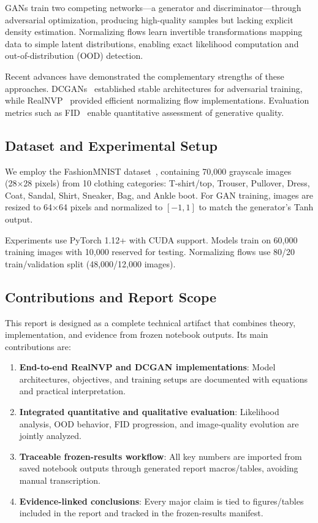 \documentclass[conference,12pt]{IEEEtran}
\begin{document}
GANs train two competing networks---a generator and discriminator---through adversarial optimization, producing high-quality samples but lacking explicit density estimation. Normalizing flows learn invertible transformations mapping data to simple latent distributions, enabling exact likelihood computation and out-of-distribution (OOD) detection.

Recent advances have demonstrated the complementary strengths of these approaches. DCGANs~\cite{radford2016unsupervised} established stable architectures for adversarial training, while RealNVP~\cite{dinh2017density} provided efficient normalizing flow implementations. Evaluation metrics such as FID~\cite{heusel2017gans} enable quantitative assessment of generative quality.

\subsection{Dataset and Experimental Setup}

We employ the FashionMNIST dataset~\cite{xiao2017fashion}, containing 70,000 grayscale images (28×28 pixels) from 10 clothing categories: T-shirt/top, Trouser, Pullover, Dress, Coat, Sandal, Shirt, Sneaker, Bag, and Ankle boot. For GAN training, images are resized to 64×64 pixels and normalized to $[-1,1]$ to match the generator's Tanh output.

Experiments use PyTorch 1.12+ with CUDA support. Models train on 60,000 training images with 10,000 reserved for testing. Normalizing flows use 80/20 train/validation split (48,000/12,000 images).

\subsection{Contributions and Report Scope}

This report is designed as a complete technical artifact that combines theory, implementation, and evidence from frozen notebook outputs. Its main contributions are:
\begin{enumerate}
    \item \textbf{End-to-end RealNVP and DCGAN implementations}: Model architectures, objectives, and training setups are documented with equations and practical interpretation.
    \item \textbf{Integrated quantitative and qualitative evaluation}: Likelihood analysis, OOD behavior, FID progression, and image-quality evolution are jointly analyzed.
    \item \textbf{Traceable frozen-results workflow}: All key numbers are imported from saved notebook outputs through generated report macros/tables, avoiding manual transcription.
    \item \textbf{Evidence-linked conclusions}: Every major claim is tied to figures/tables included in the report and tracked in the frozen-results manifest.
\end{enumerate}
\end{document}
